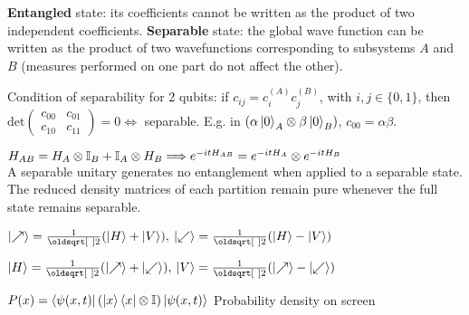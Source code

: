 \begin{squishlist}
    \item \textbf{Entangled} state: its coefficients cannot be written as the product of two independent coefficients. 
        \textbf{Separable} state: the global wave function can be written as the product of two wavefunctions corresponding to subsystems $A$ and $B$ (measures performed on one part do not affect the other).
    \item Condition of separability for 2 qubits: if $c_{ij} = c^{(A)}_i c^{(B)}_j$, with $i,j\in \{0,1\}$, then
        $\mathrm{det} \begin{pmatrix} c_{00} & c_{01} \\ c_{10} & c_{11} \end{pmatrix} = 0 \Leftrightarrow $ separable. E.g. in $\left(\alpha \ket{0}_A \otimes \beta \ket{0}_B\right)$, $c_{00} = \alpha \beta$.
    \item $H_{AB} = H_A \otimes \mathbb{I}_B + \mathbb{I}_A \otimes H_B \Longrightarrow e^{-itH_{AB}} = e^{-itH_A} \otimes e^{-itH_B}$ \\ A separable unitary generates no entanglement when applied to a separable state. The reduced density matrices of each partition remain pure whenever the full state remains separable.
\end{squishlist}

\columnbreak

\begin{squishlist}
    \item $\ket{\nearrow} = \frac{1}{\sqrt{2}}(\ket{H}+\ket{V}),\: \ket{\swarrow} = \frac{1}{\sqrt{2}}(\ket{H} - \ket{V})$
    \item $\ket{H} = \frac{1}{\sqrt{2}}(\ket{\nearrow} + \ket{\swarrow}),\: \ket{V} = \frac{1}{\sqrt{2}}(\ket{\nearrow} - \ket{\swarrow})$
    \item $P(x) = \braket{\psi(x,t)|\left(\ket{x}\bra{x} \otimes \mathbb{I}\right)| \psi(x,t)}$ Probability density on screen
\end{squishlist}


